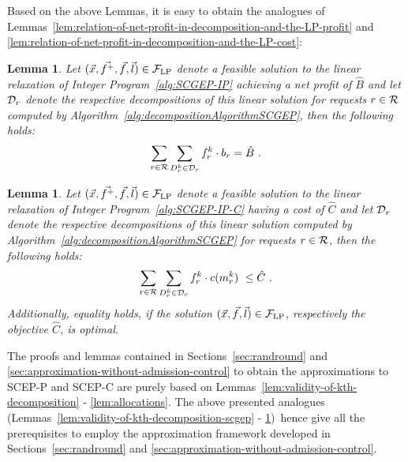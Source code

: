 \documentclass[10pt, conference, letterpaper]{IEEEtran}
\newtheorem{lemma}[theorem]{Lemma}
\begin{document}
Based on the above Lemmas, it is easy to obtain the analogues of Lemmas~\ref{lem:relation-of-net-profit-in-decomposition-and-the-LP-profit} and \ref{lem:relation-of-net-profit-in-decomposition-and-the-LP-cost}:

\begin{lemma}
\label{lem:relation-of-net-profit-in-decomposition-and-the-LP-profit-scgep}
Let $(\vec{x}, \vec{f^+}, \vec{f}, \vec{l}) \in  \mathcal{F}_{\textnormal{LP}}$ denote a \emph{feasible} solution to the linear relaxation of Integer Program~\ref{alg:SCGEP-IP} achieving a net profit of $\hat{B}$ and let $\PotEmbeddings$ denote the respective decompositions of this linear solution for requests $r \in \mathcal{R}$ computed by Algorithm~\ref{alg:decompositionAlgorithmSCGEP}, then the following holds:
\begin{align}
\sum_{\req \in \requests} \sum_{\decomp \in \PotEmbeddings} \prob \cdot \Vprofit = \hat{B}~.
\end{align}
\end{lemma}

\begin{lemma}
\label{lem:relation-of-net-profit-in-decomposition-and-the-LP-cost-scgep}
Let $(\vec{x}, \vec{f^+}, \vec{f}, \vec{l}) \in  \mathcal{F}_{\textnormal{LP}}$ denote a \emph{feasible} solution to the linear relaxation of Integer Program~\ref{alg:SCGEP-IP-C} having a cost of $\hat{C}$ and let $\PotEmbeddings$ denote the respective decompositions of this linear solution computed by Algorithm~\ref{alg:decompositionAlgorithmSCGEP} for requests $r \in \mathcal{R}$, then the following holds:
\begin{align}
\sum_{\req \in \requests} \sum_{\decomp \in \PotEmbeddings} \prob \cdot c(\mapping)~\leq \hat{C}~.
\end{align}
Additionally, equality holds, if the solution $(\vec{x}, \vec{f}, \vec{l}) \in  \mathcal{F}_{\textnormal{LP}}$, respectively the objective $\hat{C}$, is optimal.
\end{lemma}





The proofs and lemmas contained in Sections~\ref{sec:randround} and \ref{sec:approximation-without-admission-control} to obtain the approximations to SCEP-P and SCEP-C are purely based on Lemmas~\ref{lem:validity-of-kth-decomposition} - \ref{lem:allocations}. The above presented analogues (Lemmas~\ref{lem:validity-of-kth-decomposition-scgep} - \ref{lem:relation-of-net-profit-in-decomposition-and-the-LP-cost-scgep})~hence give all the prerequisites to employ the approximation framework developed in Sections~\ref{sec:randround} and \ref{sec:approximation-without-admission-control}. 
\end{document}
